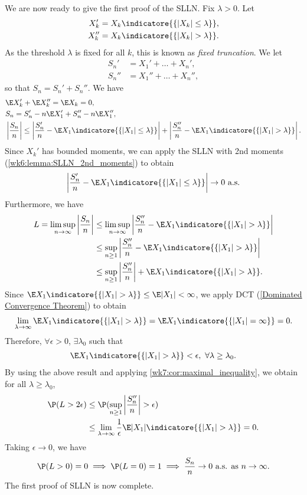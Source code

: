 \documentclass[../aipt.tex]{subfiles}
\begin{document}
We are now ready to give the first proof of the SLLN. Fix $\lambda>0$. Let
\begin{align*}
X_k' &= X_k \indicatore{\{|X_k| \leq \lambda\}}, \\
X_k'' &= X_k \indicatore{\{|X_k| > \lambda\}}.
\end{align*}
As the threshold $\lambda$ is fixed for all $k$, this is known as \emph{fixed truncation}. We let
\begin{align*}
S_n' &= X_1' + \ldots + X_n', \\
S_n'' &= X_1'' + \ldots + X_n'',
\end{align*}
so that $S_n = S_n' + S_n''$. We have
\begin{align*}
&\E X_k' + \E X_k'' = \E X_k = 0, \\
& S_n = S_n' - n\E X_1' + S_n'' - n\E X_1'',\\
&\left| \frac{S_n}{n} \right| \leq 
\left| \frac{S_n'}{n} - \E X_1 \indicatore{\{|X_1| \leq \lambda\}} \right| +
\left| \frac{S_n''}{n} - \E X_1 \indicatore{\{|X_1| > \lambda\}} \right|.
\end{align*}
Since $X_k'$ has bounded moments, we can apply the SLLN with 2nd moments (\cref{wk6:lemma:SLLN_2nd_moments}) to obtain
\begin{align*}
\left| \frac{S_n'}{n} - \E X_1 \indicatore{\{|X_1| \leq \lambda\}} \right| \to 0 \ \text{a.s.}
\end{align*}
Furthermore, we have
\begin{align*}
L =
\limsup_{n \to \infty} \left| \frac{S_n}{n} \right|
&\leq \limsup_{n \to \infty} \left| \frac{S_n''}{n} - \E X_1 \indicatore{\{|X_1| > \lambda\}} \right| \\
&\leq \sup_{n \geq 1} \left| \frac{S_n''}{n} - \E X_1 \indicatore{\{|X_1| > \lambda\}} \right| \\
&\leq \sup_{n \geq 1} \left| \frac{S_n''}{n} \right| + \E X_1 \indicatore{\{|X_1| > \lambda\}} .
\end{align*}
Since $\E X_1 \indicatore{\{|X_1| > \lambda\}} \leq \E |X_1| < \infty$, we apply DCT (\cref{Dominated Convergence Theorem}) to obtain
\begin{align*}
\lim_{\lambda \to \infty} \E X_1 \indicatore{\{|X_1| > \lambda\}} 
= \E X_1 \indicatore{\{|X_1| = \infty\}} = 0.
\end{align*}
Therefore, $\forall \epsilon > 0$, $\exists \lambda_0$ such that
\begin{align*}
\E X_1 \indicatore{\{|X_1| > \lambda\}} < \epsilon,\ \forall \lambda \geq \lambda_0.
\end{align*}
By using the above result and applying \cref{wk7:cor:maximal_inequality}, we obtain for all $\lambda \geq \lambda_0$, 
\begin{align*}
\P(L > 2\epsilon) 
&\leq \P(\sup_{n \geq 1} \left| \frac{S_n''}{n} \right| > \epsilon) \\
&\leq \lim_{\lambda \to \infty} \frac{1}{\epsilon} \E |X_1| \indicatore{\{|X_1| > \lambda\}} = 0.
\end{align*}
Taking $\epsilon \to 0$, we have
\begin{align*}
\P(L > 0) = 0 \implies \P(L = 0) = 1
\implies
\frac{S_n}{n} \to 0 \ \text{a.s. as} \ n \to \infty.
\end{align*}
The first proof of SLLN is now complete.
%
%
\end{document}
